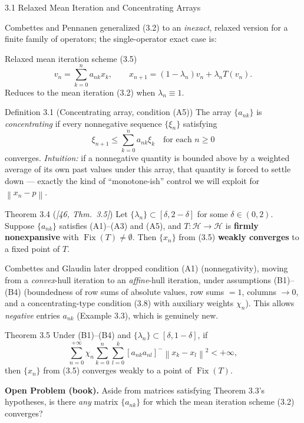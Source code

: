 \documentclass[aspectratio=169,10pt]{beamer}
\newcommand{\cH}{\mathcal{H}}
\newcommand{\Fix}{\operatorname{Fix}}
\newcommand{\norm}[1]{\left\|#1\right\|}
\begin{document}
\begin{frame}[allowframebreaks]{3.1 Relaxed Mean Iteration and Concentrating Arrays}

  Combettes and Pennanen generalized (3.2) to an \emph{inexact}, relaxed
  version for a finite family of operators; the single-operator exact
  case is:

  \begin{block}{Relaxed mean iteration scheme (3.5)}
    $$v_n=\sum_{k=0}^{n}a_{nk}x_k, \qquad
      x_{n+1}=(1-\lambda_n)v_n+\lambda_n T(v_n).$$
    Reduces to the mean iteration (3.2) when $\lambda_n\equiv1$.
  \end{block}

  \begin{block}{Definition 3.1 (Concentrating array, condition (A5))}
    The array $\{a_{nk}\}$ is \emph{concentrating} if every nonnegative
    sequence $\{\xi_n\}$ satisfying
    $$\xi_{n+1}\le\sum_{k=0}^n a_{nk}\xi_k \quad\text{for each } n\ge0$$
    converges. \emph{Intuition:} if a nonnegative quantity is bounded
    above by a weighted average of its own past values under this
    array, that quantity is forced to settle down --- exactly the kind
    of ``monotone-ish'' control we will exploit for $\norm{x_n-p}$.
  \end{block}

  \framebreak

  \begin{block}{Theorem 3.4 (\emph{[46, Thm.\ 3.5]})}
    Let $\{\lambda_n\}\subset[\delta,2-\delta]$ for some $\delta\in(0,2)$.
    Suppose $\{a_{nk}\}$ satisfies (A1)--(A3) and (A5), and
    $T:\cH\to\cH$ is \textbf{firmly nonexpansive} with $\Fix(T)\ne\emptyset$.
    Then $\{x_n\}$ from (3.5) \textbf{weakly converges} to a fixed
    point of $T$.
  \end{block}

  Combettes and Glaudin later dropped condition (A1) (nonnegativity),
  moving from a \emph{convex}-hull iteration to an \emph{affine}-hull
  iteration, under assumptions (B1)--(B4) (boundedness of row sums of
  absolute values, row sums $=1$, columns $\to0$, and a concentrating-type
  condition (3.8) with auxiliary weights $\chi_n$). This allows
  \emph{negative} entries $a_{nk}$ (Example 3.3), which is genuinely new.

  \begin{block}{Theorem 3.5}
    Under (B1)--(B4) and $\{\lambda_n\}\subset[\delta,1-\delta]$, if
    $$\sum_{n=0}^{+\infty}\chi_n\sum_{k=0}^n\sum_{l=0}^k
        [a_{nk}a_{nl}]^{-}\norm{x_k-x_l}^2<+\infty,$$
    then $\{x_n\}$ from (3.5) converges weakly to a point of $\Fix(T)$.
  \end{block}

  \textbf{Open Problem (book).} Aside from matrices satisfying
  Theorem 3.3's hypotheses, is there \emph{any} matrix $\{a_{nk}\}$ for
  which the mean iteration scheme (3.2) converges?
\end{frame}
\end{document}
